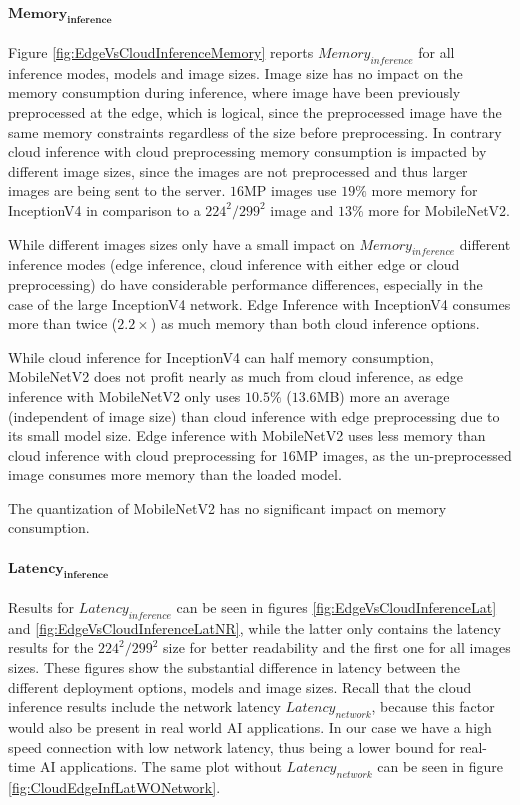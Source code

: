 \paragraph{$\mathbf{Memory_{inference}}$}
Figure \ref{fig:EdgeVsCloudInferenceMemory} reports $Memory_{inference}$ for all inference modes, models and image sizes.
Image size has no impact on the memory consumption during inference, where image have been previously preprocessed at the edge, which is logical, since the preprocessed image have the same memory constraints regardless of the size before preprocessing.
In contrary cloud inference with cloud preprocessing memory consumption is impacted by different image sizes, since the images are not preprocessed and thus larger images are being sent to the server.
$16$MP images use $19\%$ more memory for InceptionV4 in comparison to a $224^2/299^2$ image and $13\%$ more for MobileNetV2.


While different images sizes only have a small impact on $Memory_{inference}$ different inference modes (edge inference, cloud inference with either edge or cloud preprocessing) do have considerable performance differences, especially in the case of the large InceptionV4 network.
Edge Inference with InceptionV4 consumes more than twice ($2.2\times$) as much memory than both cloud inference options.

While cloud inference for InceptionV4 can half memory consumption, MobileNetV2 does not profit nearly as much from cloud inference, as edge inference with MobileNetV2 only uses $10.5\%$ ($13.6$MB) more an average (independent of image size) than cloud inference with edge preprocessing due to its small model size.
Edge inference with MobileNetV2 uses less memory than cloud inference with cloud preprocessing for $16$MP images, as the un-preprocessed image consumes more memory than the loaded model. 

The quantization of MobileNetV2 has no significant impact on memory consumption.


\paragraph{$\mathbf{Latency_{inference}}$}
Results for $Latency_{inference}$ can be seen in figures \ref{fig:EdgeVsCloudInferenceLat} and \ref{fig:EdgeVsCloudInferenceLatNR}, while the latter only contains the latency results for the $224^2/299^2$ size for better readability and the first one for all images sizes.
These figures show the substantial difference in latency between the different deployment options, models and image sizes.
Recall that the cloud inference results include the network latency $Latency_{network}$, because this factor would also be present in real world AI applications.  In our case we have a high speed connection with low network latency, thus being a lower bound for real-time AI applications. 
The same plot without $Latency_{network}$ can be seen in figure \ref{fig:CloudEdgeInfLatWONetwork}.


